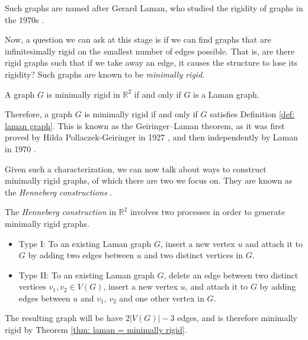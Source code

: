 \begin{flushleft}
Such graphs are named after Gerard Laman, who studied the rigidity of graphs in the 1970s \cite{minimally_rigid}. 

Now, a question we can ask at this stage is if we can find graphs that are infinitesimally rigid on the smallest number of edges possible. That is, are there rigid graphs such that if we take away an edge, it causes the structure to lose its rigidity? Such graphs are known to be \textit{minimally rigid}.
\end{flushleft}

\begin{theorem}
\label{thm: laman = minimally rigid}
\cite{minimally_rigid} A graph $G$ is minimally rigid in $\mathbb{R}^2$ if and only if $G$ is a Laman graph. 
\end{theorem}

\begin{flushleft}
Therefore, a graph $G$ is minimally rigid if and only if $G$ satisfies Definition \ref{def: laman graph}. This is known as the Geiringer–Laman theorem, as it was first proved by Hilda Pollaczek-Geiringer in 1927 \cite{laman_theorem}, and then independently by Laman in 1970 \cite{minimally_rigid}.
\end{flushleft}

\begin{flushleft}
Given such a characterization, we can now talk about ways to construct minimally rigid graphs, of which there are two we focus on. They are known as the \textit{Henneberg constructions} \cite{henneberg}.
\end{flushleft}

\begin{definition}
\label{def: henneberg}
The \textit{Henneberg construction} in $\mathbb{R}^2$ involves two processes in order to generate minimally rigid graphs.
\begin{itemize}
    \item Type I: To an existing Laman graph $G$, insert a new vertex $u$ and attach it to $G$ by adding two edges between $u$ and two distinct vertices in $G$.
    \item Type II: To an existing Laman graph $G$, delete an edge between two distinct vertices $v_1,v_2 \in V(G)$, insert a new vertex $u$, and attach it to $G$ by adding edges between $u$ and $v_1$, $v_2$ and one other vertex in $G$. 
\end{itemize}
\noindent
The resulting graph will be have $2|V(G)|-3$ edges, and is therefore minimally rigid by Theorem \ref{thm: laman = minimally rigid}.
\end{definition}

